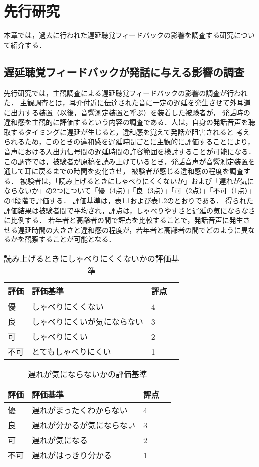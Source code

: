 \chapter{先行研究}
本章では，過去に行われた遅延聴覚フィードバックの影響を調査する研究について紹介する．
\section{遅延聴覚フィードバックが発話に与える影響の調査}
先行研究\cite{kayama}では，主観調査による遅延聴覚フィードバックの影響の調査が行われた．
主観調査とは，耳介付近に伝達された音に一定の遅延を発生させて外耳道に出力する装置（以後，音響測定装置と呼ぶ）を装着した被験者が，
発話時の違和感を主観的に評価するという内容の調査である．人は，自身の発話音声を聴取するタイミングに遅延が生じると，違和感を覚えて発話が阻害されると
考えられるため，このときの違和感を遅延時間ごとに主観的に評価することにより，音声における入出力信号間の遅延時間の許容範囲を検討することが可能になる．
この調査では，被験者が原稿を読み上げているとき，発話音声が音響測定装置を通して耳に戻るまでの時間を変化させ，
被験者が感じる違和感の程度を調査する．
被験者は，「読み上げるときにしゃべりにくくないか」および「遅れが気にならないか」の2つについて「優（4点）」「良（3点）」「可（2点）」「不可（1点）」の4段階で評価する．
評価基準は，表\ref{table:evaluation-1}および表\ref{table:evaluation-2}のとおりである．
得られた評価結果は被験者間で平均され，評点は，しゃべりやすさと遅延の気にならなさに比例する．
若年者と高齢者の間で評点を比較することで，発話音声に発生させる遅延時間の大きさと違和感の程度が，若年者と高齢者の間でどのように異なるかを観察することが可能となる．
\begin{table}[tbp]
  \caption{読み上げるときにしゃべりにくくないかの評価基準}
  \label{table:evaluation-1}
  \centering
  \begin{tabular}{lllc}
    \hline
    評価 & 評価基準 & 評点\\
    \hline \hline
    優  & しゃべりにくくない & 4\\
    良  & しゃべりにくいが気にならない & 3\\
    可  & しゃべりにくい & 2\\
    不可  & とてもしゃべりにくい & 1\\
    \hline
  \end{tabular}
\end{table}
\begin{table}[tbp]
  \caption{遅れが気にならないかの評価基準}
  \label{table:evaluation-2}
  \centering
  \begin{tabular}{lllc}
    \hline
    評価 & 評価基準 & 評点\\
    \hline \hline
    優  & 遅れがまったくわからない & 4\\
    良  & 遅れが分かるが気にならない & 3\\
    可  & 遅れが気になる & 2\\
    不可  & 遅れがはっきり分かる & 1\\
    \hline
  \end{tabular}
\end{table}

